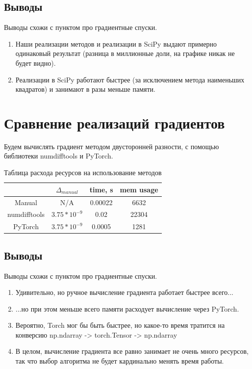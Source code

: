 \documentclass[a4paper,14pt,oneside,openany]{memoir}
\begin{document}
\subsection{Выводы}
Выводы схожи с пунктом про градиентные спуски.
\begin{enumerate}
\item Наши реализации методов и реализации в SciPy выдают примерно одинаковый результат (разница в миллионные доли, на графике никак не будет видно).
\item Реализации в SciPy работают быстрее (за исключением метода наименьших квадратов) и занимают в разы меньше памяти.
\end{enumerate}
\newpage
\section{Сравнение реализаций градиентов}
Будем вычислять градиент методом двусторонней разности, с помощью библиотеки numdifftools и PyTorch.
\FloatBarrier
\begin{table}
	\centering
	\begin{tabular}{|c|c|c|c| }
	\hline
	& $\Delta_{manual}$ & time, s & mem usage \\
	\hline
	Manual & N/A & 0.00022 & 6632 \\
	\hline
	numdifftools & $3.75*10^{-9}$ & 0.02 & 22304 \\
	\hline
	PyTorch & $3.75*10^{-9}$ & 0.0005 & 1281 \\
	\hline
	\end{tabular}
	\caption{Таблица расхода ресурсов на использование методов}
\end{table}
\FloatBarrier
\subsection{Выводы}
Выводы схожи с пунктом про градиентные спуски.
\begin{enumerate}
\item Удивительно, но ручное вычисление градиента работает быстрее всего...
\item ...но при этом меньше всего памяти расходует вычисление через PyTorch.
\item Вероятно, Torch мог бы быть быстрее, но какое-то время тратится на конверсию np.ndarray -> torch.Tensor -> np.ndarray
\item В целом, вычисление градиента все равно занимает не очень много ресурсов, так что выбор алгоритма не будет кардинально менять время работы.
\end{enumerate}
\newpage
\end{document}
